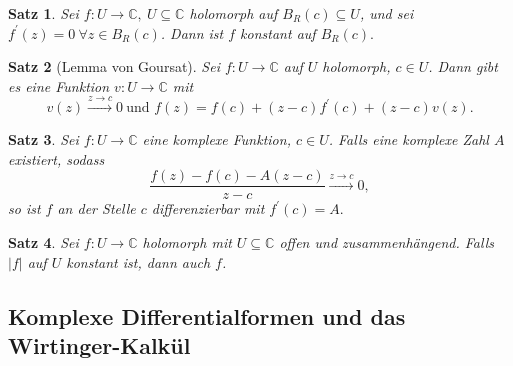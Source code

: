 \documentclass[a4paper,12pt]{book}
\theoremstyle{newthm}
\newtheorem{thm}{Satz}[section]
\theoremstyle{newdef}
\theoremstyle{newrem}
\newcommand{\C}{\mathbb{C}}
\begin{document}
		\begin{thm}
			Sei $ f: U \to \C,\ U \subseteq \C $ holomorph auf $ B_R(c) \subseteq U $, und sei $ f^\prime(z) = 0\ \forall z \in B_R(c) $. Dann ist $f$ konstant auf $ B_R(c). $
		\end{thm}
		
		\begin{thm}[Lemma von Goursat]
			Sei $ f: U \to \C $ auf $U$ holomorph, $ c \in U $. Dann gibt es eine Funktion $ v: U \to \C $ mit 
			$$ v(z) \overset{z \to c}{\longrightarrow} 0\ \text{und } f(z) = f(c) + (z-c)f^\prime(c) + (z-c) v(z). $$
		\end{thm}
		
		\begin{thm}
			Sei $ f: U \to \C $ eine komplexe Funktion, $ c \in U $. Falls eine komplexe Zahl $A$ existiert, sodass 
			\[ \frac{f(z) - f(c) - A(z-c)}{z-c} \overset{z \to c}{\longrightarrow} 0, \]
			so ist $f$ an der Stelle $c$ differenzierbar mit $ f^\prime(c) = A. $
		\end{thm}
		
		\begin{thm}
			Sei $ f: U \to \C $ holomorph mit $ U \subseteq \C $ offen und zusammenhängend. Falls $ |f| $ auf $U$ konstant ist, dann auch $f$.
		\end{thm}
	
	
	
	\subsection*{Komplexe Differentialformen und das Wirtinger-Kalkül}
		
\end{document}
